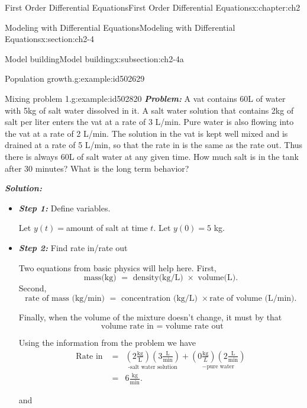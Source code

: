 \documentclass[oneside,10pt,]{book}
\newcommand{\alert}[1]{\textbf{\textit{#1}}}
\numberwithin{equation}{section}
\numberwithin{equation}{section}
\newcommand{\amp}{&}
\begin{document}
\begin{chapterptx}{First Order Differential Equations}{}{First Order Differential Equations}{}{}{x:chapter:ch2}
\begin{sectionptx}{Modeling with Differential Equations}{}{Modeling with Differential Equations}{}{}{x:section:ch2-4}
\begin{subsectionptx}{Model building}{}{Model building}{}{}{x:subsection:ch2-4a}
\begin{example}{Population growth.}{g:example:id502629}
\begin{itemize}[label=\textbullet]
\end{itemize}
\end{example}
\begin{example}{Mixing problem 1.}{g:example:id502820}%
\alert{Problem:} A vat contains 60L of water with 5kg of salt water dissolved in it. A salt water solution that contains 2kg of salt per liter enters the vat at a rate of 3 L\slash{}min. Pure water is also flowing into the vat at a rate of 2 L\slash{}min. The solution in the vat is kept well mixed and is drained at a rate of 5 L\slash{}min, so that the rate in is the same as the rate out. Thus there is always 60L of salt water at any given time. How much salt is in the tank after 30 minutes? What is the long term behavior?%
\par
\alert{Solution:}%
%
\begin{itemize}[label=\textbullet]
\item{}\alert{Step 1:} Define variables.%
\par
Let \(y(t)=\)amount of salt at time \(t\). Let \(y(0)=5\) kg.%
\item{}\alert{Step 2:} Find rate in\slash{}rate out%
\par
Two equations from basic physics will help here. First,%
\begin{equation*}
\text{mass(kg) } = \text{ density(kg/L) } \times \text{ volume(L)}.
\end{equation*}
Second,%
\begin{equation*}
\text{rate of mass (kg/min) } = \text{ concentration (kg/L) } \times \text{rate of volume (L/min)}.
\end{equation*}
%
\par
Finally, when the volume of the mixture doesn't change, it must by that%
\begin{equation*}
\text{ volume rate in } = \text{ volume rate out}
\end{equation*}
%
\par
Using the information from the problem we have%
\begin{align*}
\mbox{Rate in } \amp = \amp \underset{\mbox{-salt water solution}}{\left(2\frac{\mbox{kg}}{\mbox{L}}\right)\left(3\frac{\mbox{L}}{\mbox{min}}\right)}+\underset{-\mbox{pure water}}{\left(0\frac{\mbox{kg}}{L}\right)\left(2\frac{\mbox{L}}{\mbox{min}}\right)}\\
\amp = \amp 6\frac{\mbox{kg}}{\mbox{min}}.
\end{align*}
%
\par
and%
%
\begin{align*}

\end{align*}
\end{itemize}
\end{example}
\end{subsectionptx}
\end{sectionptx}
\end{chapterptx}
\end{document}
